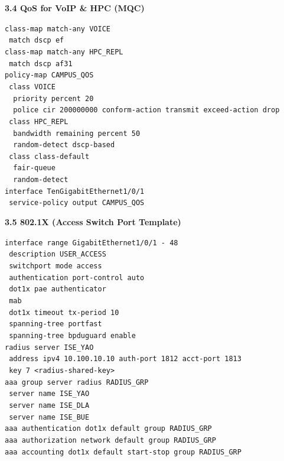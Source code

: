\documentclass[11pt]{article}
\begin{document}
\begin{exoresolu}
\medskip
\textbf{3.4 QoS for VoIP \& HPC (MQC)}\par
\texttt{class-map match-any VOICE}\\
\texttt{\ match dscp ef}\\
\texttt{class-map match-any HPC\_REPL}\\
\texttt{\ match dscp af31}\\
\texttt{policy-map CAMPUS\_QOS}\\
\texttt{\ class VOICE}\\
\texttt{\ \ priority percent 20}\\
\texttt{\ \ police cir 200000000 conform-action transmit exceed-action drop}\\
\texttt{\ class HPC\_REPL}\\
\texttt{\ \ bandwidth remaining percent 50}\\
\texttt{\ \ random-detect dscp-based}\\
\texttt{\ class class-default}\\
\texttt{\ \ fair-queue}\\
\texttt{\ \ random-detect}\\
\texttt{interface TenGigabitEthernet1/0/1}\\
\texttt{\ service-policy output CAMPUS\_QOS}

\medskip
\textbf{3.5 802.1X (Access Switch Port Template)}\par
\texttt{interface range GigabitEthernet1/0/1 - 48}\\
\texttt{\ description USER\_ACCESS}\\
\texttt{\ switchport mode access}\\
\texttt{\ authentication port-control auto}\\
\texttt{\ dot1x pae authenticator}\\
\texttt{\ mab}\\
\texttt{\ dot1x timeout tx-period 10}\\
\texttt{\ spanning-tree portfast}\\
\texttt{\ spanning-tree bpduguard enable}\\
\texttt{radius server ISE\_YAO}\\
\texttt{\ address ipv4 10.100.10.10 auth-port 1812 acct-port 1813}\\
\texttt{\ key 7 <radius-shared-key>}\\
\texttt{aaa group server radius RADIUS\_GRP}\\
\texttt{\ server name ISE\_YAO}\\
\texttt{\ server name ISE\_DLA}\\
\texttt{\ server name ISE\_BUE}\\
\texttt{aaa authentication dot1x default group RADIUS\_GRP}\\
\texttt{aaa authorization network default group RADIUS\_GRP}\\
\texttt{aaa accounting dot1x default start-stop group RADIUS\_GRP}
\end{exoresolu}
\end{document}
